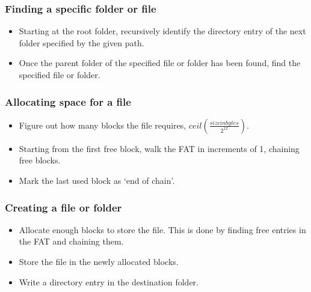\documentclass[11pt]{article}
\begin{document}
        \subsubsection{Finding a specific folder or file}\label{finding-a-specific-folder-or-file}
            \begin{itemize}
                \itemsep1pt\parskip0pt
                \item{Starting at the root folder, recursively identify the directory entry}
                  of the next folder specified by the given path.
                \item{Once the parent folder of the specified file or folder has been found,}
                  find the specified file or folder.
            \end{itemize}

        \subsubsection{Allocating space for a file}\label{allocating-space-for-a-file}

            \begin{itemize}
                \itemsep1pt\parskip0pt
                \item{Figure out how many blocks the file requires,}
                  $ceil(\frac{size in bytes}{2^{12}})$.
                \item{Starting from the first free block, walk the FAT in increments of 1, chaining free blocks.}
                \item{Mark the last used block as `end of chain'.}
            \end{itemize}

        \subsubsection{Creating a file or folder}\label{creating-a-file-or-folder}

            \begin{itemize}
                \itemsep1pt\parskip0pt
                \item{Allocate enough blocks to store the file. This is done by finding free entries in the FAT and chaining them.}
                \item{Store the file in the newly allocated blocks.}
                \item{Write a directory entry in the destination folder.}
            \end{itemize}
\end{document}
